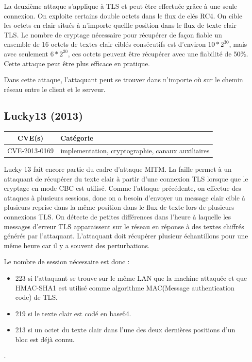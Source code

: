 La deuxième attaque s'applique à TLS et peut être effectuée grâce à une seule connexion. On exploite certains double octets dans le flux de clés RC4. On cible les octets en clair situés à n'importe quellle position dans le flux de texte clair TLS. Le nombre de cryptage nécessaire pour récupérer de façon fiable un ensemble de 16 octets de textes clair ciblés consécutifs est d'environ $10*2^{30}$, mais avec seulement $6*2^{30}$, ces octets peuvent être récupérer avec une fiabilité de 50\%. Cette attaque peut être plus efficace en pratique.

Dans cette attaque, l'attaquant peut se trouver dans n'importe où sur le chemin réseau entre le client et le serveur\cite{rc4}.




\subsection{Lucky13 (2013)}

\begin{tabularx}{0.96\textwidth}{|c|X|}
  \hline
  \textbf{CVE(s)} & \textbf{Catégorie} \\
  \hline
  CVE-2013-0169 & implementation, cryptographie, canaux auxiliaires \\
  \hline
\end{tabularx}

\vspace{1em}

Lucky 13 fait encore partie du cadre d'attaque MITM. La faille permet à un attaquant de récupérer du texte clair à partir d'une connexion TLS lorsque que le cryptage en mode CBC est utilisé. Comme l'attaque précédente, on effectue des attaques à plusieurs sessions, donc on a besoin d'envoyer un message clair cible à plusieurs reprise dans la même position dans le flux de texte lors de plusieurs connexions TLS. On détecte de petites différences dans l'heure à laquelle les messages d'erreur TLS apparaissent sur le réseau en réponse à des textes chiffrés générés par l'attaquant. L'attaquant doit récupérer plusieur échantillons pour une même heure car il y a souvent des perturbations.

Le nombre de session nécessaire est donc :

\begin{itemize}
\item 223 si l'attaquant se trouve sur le même LAN que la machine attaquée et que HMAC-SHA1 est utilisé comme algorithme MAC(Message authentication code) de TLS.
\item 219 si le texte clair est codé en base64.
\item 213 si un octet du texte clair dans l'une des deux dernières positions d'un bloc est déjà connu.
\end{itemize}
\cite{lucky13}.


